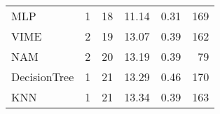 \begin{tabular}{lrrrrr}
MLP                &                  1 &  18 &  11.14 &                           0.31 &   169 \\
VIME               &                  2 &  19 &  13.07 &                           0.39 &   162 \\
NAM                &                  2 &  20 &  13.19 &                           0.39 &    79 \\
DecisionTree       &                  1 &  21 &  13.29 &                           0.46 &   170 \\
KNN                &                  1 &  21 &  13.34 &                           0.39 &   163 \\
\bottomrule
\end{tabular}
